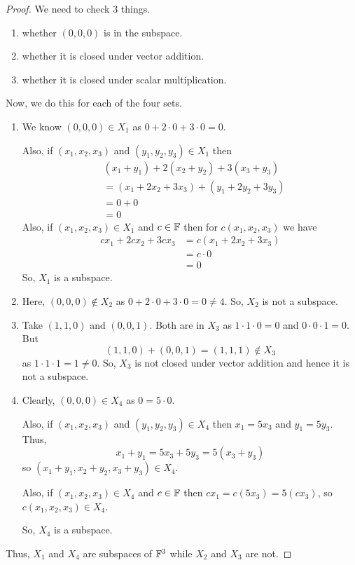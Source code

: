 \begin{proof}
We need to check 3 things.
\begin{enumerate}
\item[1)] whether $(0,0,0)$ is in the subspace.
\item[2)] whether it is closed under vector addition.
\item[3)] whether it is closed under scalar multiplication.
\end{enumerate}
Now, we do this for each of the four sets.
\begin{enumerate}
\item[(a)] We know $(0,0,0) \in X_1$ as $0 + 2 \cdot 0 + 3 \cdot 0 = 0$.

Also, if $(x_1, x_2, x_3)$ and $(y_1, y_2, y_3) \in X_1$ then
\begin{align*}
& (x_1 + y_1) + 2(x_2 + y_2) + 3(x_3 + y_3) \\
&= (x_1 + 2x_2 + 3x_3) + (y_1 + 2y_2 + 3y_3) \\
&= 0 + 0 \\
&= 0
\end{align*}
Also, if $(x_1, x_2, x_3) \in X_1$ and $c \in \mathbb{F}$ then for $c(x_1, x_2, x_3)$ we have
\begin{align*}
cx_1 + 2cx_2 + 3cx_3 &= c(x_1 + 2x_2 + 3x_3) \\
&= c \cdot 0 \\
&= 0
\end{align*}
So, $X_1$ is a subspace.
\item[(b)] Here, $(0,0,0) \notin X_2$ as $0 + 2 \cdot 0 + 3 \cdot 0 = 0 \neq 4$. So, $X_2$ is not a subspace.
\item[(c)] Take $(1,1,0)$ and $(0,0,1)$. Both are in $X_3$ as $1 \cdot 1 \cdot 0 = 0$ and $0 \cdot 0 \cdot 1 = 0$. But
\[
(1,1,0) + (0,0,1) = (1,1,1) \notin X_3
\]
as $1 \cdot 1 \cdot 1 = 1 \neq 0$. So, $X_3$ is not closed under vector addition and hence it is not a subspace.
\item[(d)] Clearly, $(0,0,0) \in X_4$ as $0 = 5 \cdot 0$.

Also, if $(x_1, x_2, x_3)$ and $(y_1, y_2, y_3) \in X_4$ then $x_1 = 5x_3$ and $y_1 = 5y_3$. Thus,
\[
x_1 + y_1 = 5x_3 + 5y_3 = 5(x_3 + y_3)
\]
so $(x_1 + y_1, x_2 + y_2, x_3 + y_3) \in X_4$.

Also, if $(x_1, x_2, x_3) \in X_4$ and $c \in \mathbb{F}$ then $cx_1 = c(5x_3) = 5(cx_3)$, so $c(x_1, x_2, x_3) \in X_4$.

So, $X_4$ is a subspace.
\end{enumerate}
Thus, $X_1$ and $X_4$ are subspaces of $\mathbb{F}^3$ while $X_2$ and $X_3$ are not.
\end{proof}

